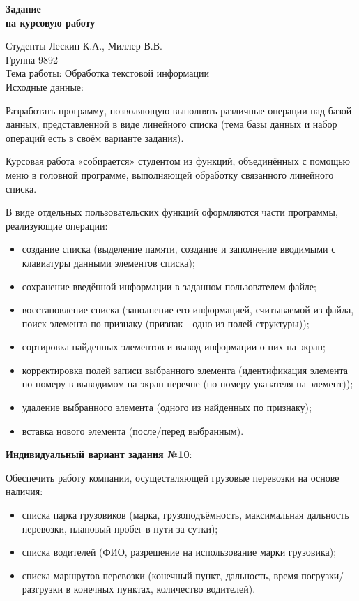 \begin{center}
	\Large{
		\textbf{Задание\\ на курсовую работу}
	}
\end{center}

Студенты Лескин К.А., Миллер В.В.\\

Группа 9892\\

Тема работы: Обработка текстовой информации\\

Исходные данные:

Разработать программу, позволяющую выполнять различные операции
над базой данных, представленной в виде линейного списка (тема базы
данных и набор операций есть в своём варианте задания).

Курсовая работа «собирается» студентом из функций, объединённых с
помощью меню в головной программе, выполняющей обработку связанного
линейного списка.

В виде отдельных пользовательских функций оформляются части
программы, реализующие операции:
\begin{itemize}
	\item создание списка (выделение памяти, создание и заполнение вводимыми с
	клавиатуры данными элементов списка);
	\item сохранение введённой информации в заданном пользователем файле;
	\item восстановление списка (заполнение его информацией, считываемой из
	файла, поиск элемента по признаку (признак - одно из полей структуры));
	\item сортировка найденных элементов и вывод информации о них на экран;
	\item корректировка полей записи выбранного элемента (идентификация
	элемента по номеру в выводимом на экран перечне (по номеру указателя
	на элемент));
	\item удаление выбранного элемента (одного из найденных по признаку);
	\item вставка нового элемента (после/перед выбранным).
\end{itemize}

\newpage

\textbf{Индивидуальный вариант задания №10}:

Обеспечить работу компании, осуществляющей грузовые
перевозки на основе наличия:

\begin{itemize}
	\item списка парка грузовиков (марка, грузоподъёмность, максимальная
	дальность перевозки, плановый пробег в пути за сутки);
	\item списка водителей (ФИО, разрешение на использование марки грузовика);
	\item списка маршрутов перевозки (конечный пункт, дальность, время
	погрузки/разгрузки в конечных пунктах, количество водителей).
\end{itemize}

